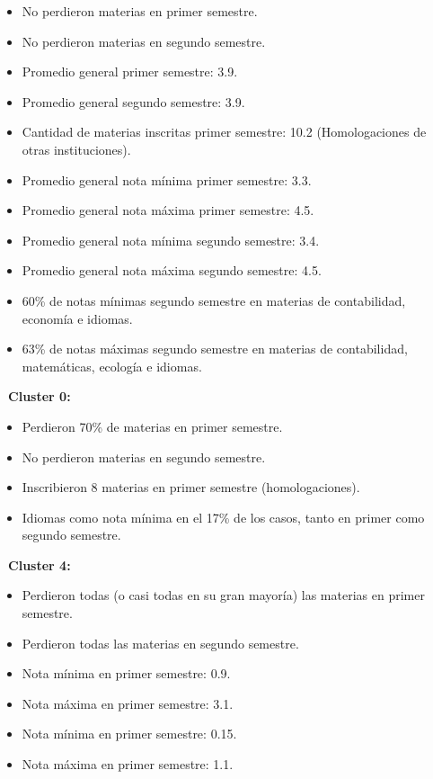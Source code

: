 \documentclass[fleqn,10pt]{SelfArx} %
\begin{document}
\begin{itemize}
	\item No perdieron materias en primer semestre.
	\item No perdieron materias en segundo semestre.
	\item Promedio general primer semestre: 3.9.
	\item Promedio general segundo semestre: 3.9.
	\item Cantidad de materias inscritas primer semestre: 10.2 (Homologaciones de otras instituciones).
	\item Promedio general nota mínima primer semestre: 3.3.
	\item Promedio general nota máxima primer semestre: 4.5.
	\item Promedio general nota mínima segundo semestre: 3.4.
	\item Promedio general nota máxima segundo semestre: 4.5.
	\item 60\% de notas mínimas segundo semestre en materias de contabilidad, economía e idiomas.
	\item 63\% de notas máximas segundo semestre en materias de contabilidad, matemáticas, ecología e idiomas.
\end{itemize} 

{\bf \textbullet\ Cluster 0:}\\

\begin{itemize}
	\item Perdieron 70\% de materias en primer semestre.
	\item No perdieron materias en segundo semestre.
	\item Inscribieron 8 materias en primer semestre (homologaciones).
	\item Idiomas como nota mínima en el 17\% de los casos, tanto en primer como segundo semestre.
\end{itemize} 

{\bf \textbullet\ Cluster 4:}\\

\begin{itemize}
	\item Perdieron todas (o casi todas en su gran mayoría) las materias en primer semestre.
	\item Perdieron todas las materias en segundo semestre.
	\item Nota mínima en primer semestre: 0.9.
	\item Nota máxima en primer semestre: 3.1.
	\item Nota mínima en primer semestre: 0.15.
	\item Nota máxima en primer semestre: 1.1.
\end{itemize}
\end{document}
